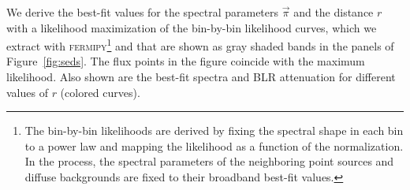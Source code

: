 \documentclass[twocolumn]{aastex62}
\begin{document}
We derive the best-fit values for the spectral parameters $\vec{\pi}$ and the distance $r$ with a likelihood maximization of the bin-by-bin likelihood curves, which we extract with \textsc{fermipy}\footnote{The bin-by-bin likelihoods are derived by fixing the spectral shape in each bin to a power law and mapping the likelihood as a function of the normalization. In the process, the spectral parameters of the neighboring point sources and diffuse backgrounds are fixed to their broadband best-fit values.} and that are shown as gray shaded bands in the panels of Figure~\ref{fig:seds}. 
The flux points in the figure coincide with the maximum likelihood. 
Also shown are the best-fit spectra and BLR attenuation for different values of $r$ (colored curves). 
\end{document}
